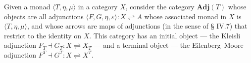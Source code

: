 Given a monad $\langle T, \eta, \mu \rangle$ in a category $X$, consider the category $\mathbf{Adj}(T)$ whose objects are all adjunctions $\langle F, G, \eta, \varepsilon \rangle : X \rightleftharpoons A$ whose associated monad in $X$ is $\langle T, \eta, \mu \rangle$, and whose arrows are maps of adjunctions (in the sense of § IV.7) that restrict to the identity on $X$. This category has an initial object — the Kleisli adjunction $F_T \dashv G_T : X \rightleftharpoons X_T$ — and a terminal object — the Eilenberg–Moore adjunction $F^T \dashv G^T : X \rightleftharpoons X^T$.
